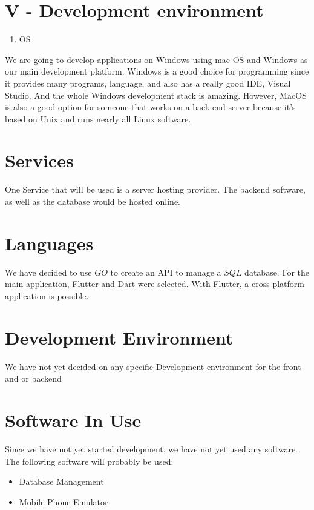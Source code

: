 \documentclass[10pt]{article}
\begin{document}
\section{V - Development environment}
\begin{enumerate}
  \item OS
\end{enumerate}

We are going to develop applications on Windows using mac OS and Windows as our main development platform. Windows is a good choice for programming since it provides many programs, language, and also has a really good IDE, Visual Studio. And the whole Windows development stack is amazing. However, MacOS is also a good option for someone that works on a back-end server because it's based on Unix and runs nearly all Linux software.

\section{Services}
One Service that will be used is a server hosting provider. The backend software, as well as the database would be hosted online.

\section{Languages}
We have decided to use $G O$ to create an API to manage a $S Q L$ database. For the main application, Flutter and Dart were selected. With Flutter, a cross platform application is possible.

\section{Development Environment}
We have not yet decided on any specific Development environment for the front and or backend

\section{Software In Use}
Since we have not yet started development, we have not yet used any software. The following software will probably be used:

\begin{itemize}
  \item Database Management

  \item Mobile Phone Emulator

\end{itemize}
\end{document}
